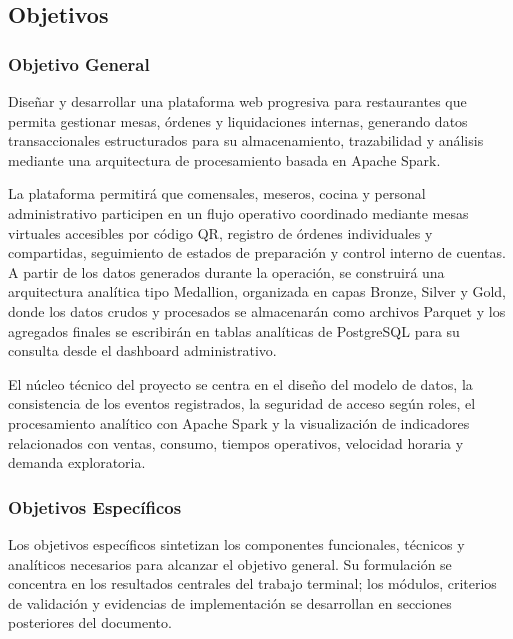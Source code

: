 \subsection{Objetivos}

\subsubsection{Objetivo General}

Diseñar y desarrollar una plataforma web progresiva para restaurantes que permita gestionar
mesas, órdenes y liquidaciones internas, generando datos transaccionales estructurados para
su almacenamiento, trazabilidad y análisis mediante una arquitectura de procesamiento basada
en Apache Spark.

La plataforma permitirá que comensales, meseros, cocina y personal administrativo participen
en un flujo operativo coordinado mediante mesas virtuales accesibles por código QR, registro
de órdenes individuales y compartidas, seguimiento de estados de preparación y control interno
de cuentas. A partir de los datos generados durante la operación, se construirá una arquitectura
analítica tipo Medallion, organizada en capas Bronze, Silver y Gold, donde los datos crudos y
procesados se almacenarán como archivos Parquet y los agregados finales se escribirán en tablas
analíticas de PostgreSQL para su consulta desde el dashboard administrativo.

El núcleo técnico del proyecto se centra en el diseño del modelo de datos, la consistencia de
los eventos registrados, la seguridad de acceso según roles, el procesamiento analítico con
Apache Spark y la visualización de indicadores relacionados con ventas, consumo, tiempos
operativos, velocidad horaria y demanda exploratoria.

\newpage

\subsubsection{Objetivos Específicos}

Los objetivos específicos sintetizan los componentes funcionales, técnicos y analíticos
necesarios para alcanzar el objetivo general. Su formulación se concentra en los resultados
centrales del trabajo terminal; los módulos, criterios de validación y evidencias de
implementación se desarrollan en secciones posteriores del documento.

